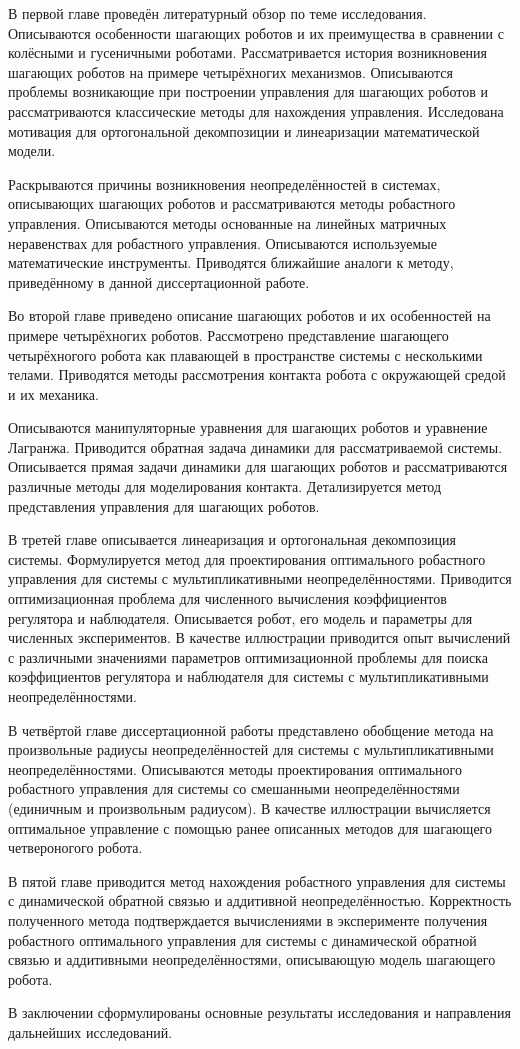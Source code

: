 В первой главе проведён литературный обзор по теме исследования. Описываются особенности шагающих роботов и их преимущества в сравнении с колёсными и гусеничными роботами. Рассматривается история возникновения шагающих роботов на примере четырёхногих механизмов. Описываются проблемы возникающие при построении управления для шагающих роботов и рассматриваются классические методы для нахождения управления. Исследована мотивация для ортогональной декомпозиции и линеаризации математической модели. 

Раскрываются причины возникновения неопределённостей в системах, описывающих шагающих роботов и рассматриваются методы робастного управления. 
Описываются методы основанные на линейных матричных неравенствах для робастного управления. Описываются используемые математические инструменты. Приводятся ближайшие аналоги к методу, приведённому в данной диссертационной работе.

Во второй главе приведено описание шагающих роботов и их особенностей на примере четырёхногих роботов. Рассмотрено представление шагающего четырёхногого робота как плавающей в пространстве системы с несколькими телами. Приводятся методы рассмотрения контакта робота с окружающей средой и их механика. 

Описываются манипуляторные уравнения для шагающих роботов и уравнение Лагранжа. Приводится обратная задача динамики для рассматриваемой системы. Описывается прямая задачи динамики для шагающих роботов и рассматриваются различные методы для моделирования контакта. Детализируется метод представления управления для шагающих роботов.

В третей главе описывается линеаризация и ортогональная декомпозиция системы. Формулируется метод для проектирования оптимального робастного управления для системы с мультипликативными неопределённостями. Приводится оптимизационная проблема для численного вычисления коэффициентов регулятора и наблюдателя. Описывается робот, его модель и параметры для численных экспериментов. В качестве иллюстрации приводится опыт вычислений с различными значениями параметров оптимизационной проблемы для поиска коэффициентов регулятора и наблюдателя для системы с мультипликативными неопределённостями. 

В четвёртой главе диссертационной работы представлено обобщение метода на произвольные радиусы неопределённостей для системы с мультипликативными неопределённостями. Описываются методы проектирования оптимального робастного управления для системы со смешанными неопределённостями (единичным и произвольным радиусом). В качестве иллюстрации вычисляется оптимальное управление с помощью ранее описанных методов для шагающего четвероногого робота.

В пятой главе приводится метод нахождения робастного управления для системы с динамической обратной связью и аддитивной неопределённостью. Корректность полученного метода подтверждается вычислениями в эксперименте получения робастного оптимального управления для системы с динамической обратной связью и аддитивными неопределённостями, описывающую модель шагающего робота.

В заключении сформулированы основные результаты исследования и направления дальнейших исследований.